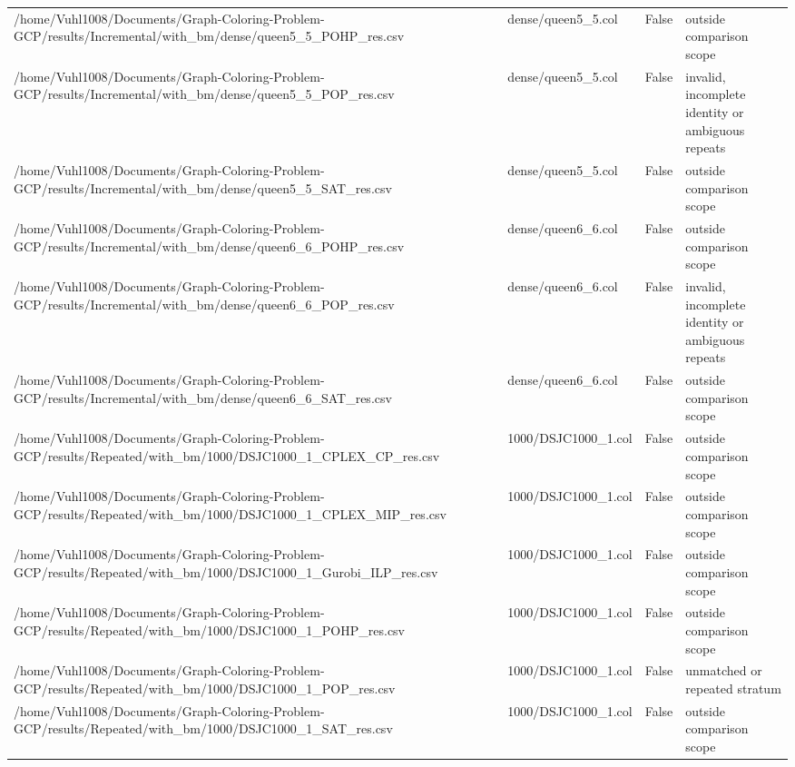 \begin{table}[htbp]
\begin{tabular}{llll}
/home/Vuhl1008/Documents/Graph-Coloring-Problem-GCP/results/Incremental/with\_bm/dense/queen5\_5\_POHP\_res.csv & dense/queen5\_5.col & False & outside comparison scope \\
/home/Vuhl1008/Documents/Graph-Coloring-Problem-GCP/results/Incremental/with\_bm/dense/queen5\_5\_POP\_res.csv & dense/queen5\_5.col & False & invalid, incomplete identity or ambiguous repeats \\
/home/Vuhl1008/Documents/Graph-Coloring-Problem-GCP/results/Incremental/with\_bm/dense/queen5\_5\_SAT\_res.csv & dense/queen5\_5.col & False & outside comparison scope \\
/home/Vuhl1008/Documents/Graph-Coloring-Problem-GCP/results/Incremental/with\_bm/dense/queen6\_6\_POHP\_res.csv & dense/queen6\_6.col & False & outside comparison scope \\
/home/Vuhl1008/Documents/Graph-Coloring-Problem-GCP/results/Incremental/with\_bm/dense/queen6\_6\_POP\_res.csv & dense/queen6\_6.col & False & invalid, incomplete identity or ambiguous repeats \\
/home/Vuhl1008/Documents/Graph-Coloring-Problem-GCP/results/Incremental/with\_bm/dense/queen6\_6\_SAT\_res.csv & dense/queen6\_6.col & False & outside comparison scope \\
/home/Vuhl1008/Documents/Graph-Coloring-Problem-GCP/results/Repeated/with\_bm/1000/DSJC1000\_1\_CPLEX\_CP\_res.csv & 1000/DSJC1000\_1.col & False & outside comparison scope \\
/home/Vuhl1008/Documents/Graph-Coloring-Problem-GCP/results/Repeated/with\_bm/1000/DSJC1000\_1\_CPLEX\_MIP\_res.csv & 1000/DSJC1000\_1.col & False & outside comparison scope \\
/home/Vuhl1008/Documents/Graph-Coloring-Problem-GCP/results/Repeated/with\_bm/1000/DSJC1000\_1\_Gurobi\_ILP\_res.csv & 1000/DSJC1000\_1.col & False & outside comparison scope \\
/home/Vuhl1008/Documents/Graph-Coloring-Problem-GCP/results/Repeated/with\_bm/1000/DSJC1000\_1\_POHP\_res.csv & 1000/DSJC1000\_1.col & False & outside comparison scope \\
/home/Vuhl1008/Documents/Graph-Coloring-Problem-GCP/results/Repeated/with\_bm/1000/DSJC1000\_1\_POP\_res.csv & 1000/DSJC1000\_1.col & False & unmatched or repeated stratum \\
/home/Vuhl1008/Documents/Graph-Coloring-Problem-GCP/results/Repeated/with\_bm/1000/DSJC1000\_1\_SAT\_res.csv & 1000/DSJC1000\_1.col & False & outside comparison scope \\

\end{tabular}
\end{table}
